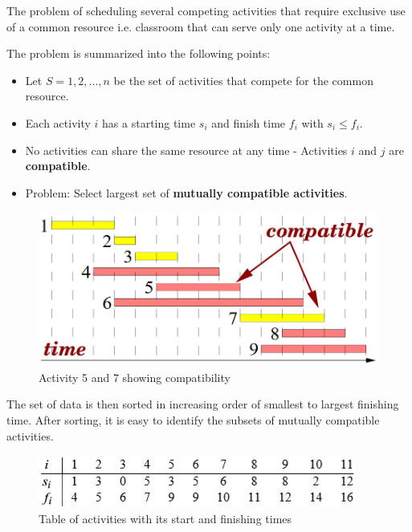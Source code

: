 \documentclass[10pt,a4paper]{article}
\begin{document}
The problem of scheduling several competing activities that require exclusive use of a common
resource i.e. classroom that can serve only one activity at a time. \par 

The problem is summarized into the following points:
\begin{itemize}
    \item Let $S={1,2,...,n}$ be the set of activities that compete for the common resource.
    \item Each activity $i$ has a starting time $s_i$ and finish time $f_i$ with $s_i\leq f_i$.
    \item No activities can share the same resource at any time - Activities $i$ and $j$ are
    \textbf{compatible}.
    \item Problem: Select largest set of \textbf{mutually compatible activities}.
\end{itemize}

\pagebreak

\begin{figure} [h!]
    \centering
    \includegraphics[scale=0.3]{compatible.JPG}
    \caption{Activity 5 and 7 showing compatibility}
\end{figure}

The set of data is then sorted in increasing order of smallest to largest finishing time. After
sorting, it is easy to identify the subsets of mutually compatible activities.
\begin{figure} [h!]
    \centering
    \includegraphics[scale=0.8]{Table.JPG}
    \caption{Table of activities with its start and finishing times}
\end{figure}
\end{document}
